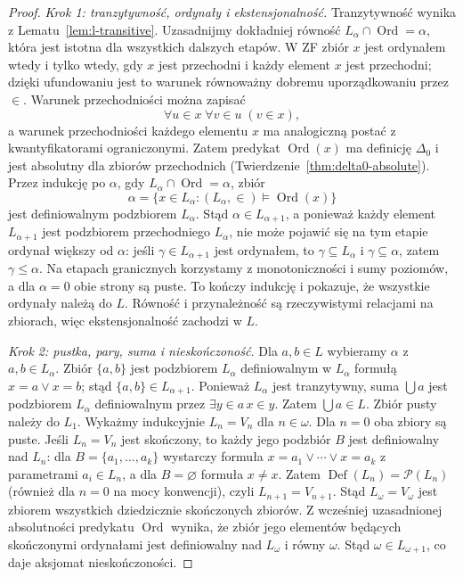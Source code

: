 \begin{proof}
\emph{Krok 1: tranzytywność, ordynały i ekstensjonalność.}
Tranzytywność wynika z Lematu~\ref{lem:l-transitive}.
Uzasadnijmy dokładniej równość
$L_\alpha\cap\operatorname{Ord}=\alpha$,
która jest istotna dla wszystkich dalszych etapów.
W ZF zbiór $x$ jest ordynałem wtedy i tylko wtedy,
gdy $x$ jest przechodni i każdy element $x$
jest przechodni; dzięki ufundowaniu
jest to warunek równoważny dobremu
uporządkowaniu przez $\in$.
Warunek przechodniości można zapisać
\[
\forall u\in x\;\forall v\in u\;(v\in x),
\]
a warunek przechodniości każdego elementu
$x$ ma analogiczną postać
z kwantyfikatorami ograniczonymi.
Zatem predykat $\operatorname{Ord}(x)$
ma definicję $\Delta_0$ i jest
absolutny dla zbiorów przechodnich
(Twierdzenie~\ref{thm:delta0-absolute}).
Przez indukcję po $\alpha$, gdy
$L_\alpha\cap\operatorname{Ord}=\alpha$,
zbiór
\[
\alpha=\{x\in L_\alpha:
             (L_\alpha,\in)\models\operatorname{Ord}(x)\}
\]
jest definiowalnym podzbiorem $L_\alpha$.
Stąd $\alpha\in L_{\alpha+1}$,
a ponieważ każdy element $L_{\alpha+1}$
jest podzbiorem przechodniego $L_\alpha$,
nie może pojawić się na tym etapie
ordynał większy od $\alpha$:
jeśli $\gamma\in L_{\alpha+1}$
jest ordynałem, to
$\gamma\subseteq L_\alpha$ i
$\gamma\subseteq\alpha$, zatem
$\gamma\le\alpha$.
Na etapach granicznych korzystamy
z monotoniczności i sumy poziomów,
a dla $\alpha=0$ obie strony są puste.
To kończy indukcję i pokazuje,
że wszystkie ordynały należą do $L$.
Równość i przynależność są rzeczywistymi relacjami
na zbiorach, więc ekstensjonalność zachodzi w $L$.

\emph{Krok 2: pustka, pary, suma i nieskończoność.}
Dla $a,b\in L$ wybieramy $\alpha$ z $a,b\in L_\alpha$.
Zbiór $\{a,b\}$ jest podzbiorem $L_\alpha$
definiowalnym w $L_\alpha$ formułą $x=a\lor x=b$;
stąd $\{a,b\}\in L_{\alpha+1}$. Ponieważ
$L_\alpha$ jest tranzytywny, suma $\bigcup a$
jest podzbiorem $L_\alpha$ definiowalnym przez
$\exists y\in a\,x\in y$. Zatem $\bigcup a\in L$.
Zbiór pusty należy do $L_1$.
Wykażmy indukcyjnie $L_n=V_n$ dla $n\in\omega$.
Dla $n=0$ oba zbiory są puste.
Jeśli $L_n=V_n$ jest skończony,
to każdy jego podzbiór $B$ jest
definiowalny nad $L_n$: dla
$B=\{a_1,\ldots,a_k\}$ wystarczy
formuła
$x=a_1\lor\cdots\lor x=a_k$
z parametrami $a_i\in L_n$,
a dla $B=\varnothing$ formuła $x\ne x$.
Zatem
$\operatorname{Def}(L_n)=\mathcal P(L_n)$
(również dla $n=0$ na mocy konwencji),
czyli $L_{n+1}=V_{n+1}$.
Stąd $L_\omega=V_\omega$ jest
zbiorem wszystkich dziedzicznie
skończonych zbiorów.
Z wcześniej uzasadnionej
absolutności predykatu
$\operatorname{Ord}$ wynika,
że zbiór jego elementów będących
skończonymi ordynałami jest
definiowalny nad $L_\omega$
i równy $\omega$.
Stąd $\omega\in L_{\omega+1}$,
co daje aksjomat nieskończoności.


\end{proof}
